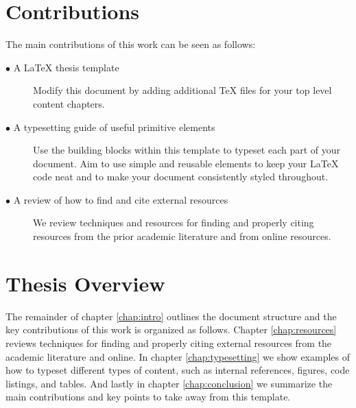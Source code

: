 	
	
	\section{Contributions} 
		\label{sec:intro_contribs} 
		
		The main contributions of this work can be seen as follows:
		
		\begin{description}	
		
			\item[$\bullet$ A LaTeX thesis template]\hfill
			
			Modify this document by adding additional TeX files for your top level content chapters. 
			
			\item[$\bullet$ A typesetting guide of useful primitive elements]\hfill
			
			Use the building blocks within this template to typeset each part of your document. Aim to use simple and reusable elements to keep your LaTeX code neat and to make your document consistently styled throughout.
			
			\item[$\bullet$ A review of how to find and cite external resources]\hfill
						
			We review techniques and resources for finding and properly citing resources from the prior academic literature and from online resources.
			
		\end{description}
	
	\section{Thesis Overview}  
	\label{sec:intro_thesis_overview} 
	
	The remainder of chapter \ref{chap:intro} outlines the document structure and the key contributions of this work is organized as follows. Chapter \ref{chap:resources} reviews techniques for finding and properly citing external resources from the academic literature and online. In chapter \ref{chap:typesetting} we show examples of how to typeset different types of content, such as internal references, figures, code listings, and tables. And lastly in chapter \ref{chap:conclusion} we summarize the main contributions and key points to take away from this template.